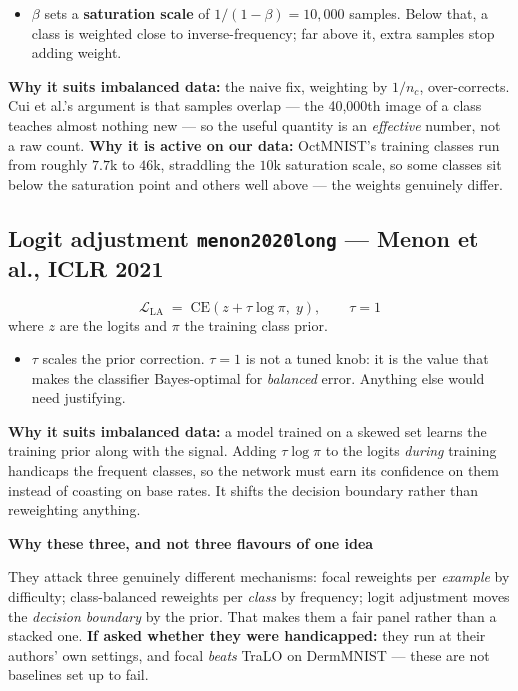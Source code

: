 \documentclass[11pt,a4paper]{article}
\newenvironment{callout}[1]
  {\par\medskip\noindent\begin{lrbox}{\calloutbox}%
   \begin{minipage}{\dimexpr\linewidth-20pt\relax}%
   \textbf{#1}\par\smallskip}
  {\end{minipage}\end{lrbox}%
   \setlength{\fboxsep}{10pt}%
   \colorbox{boxgrey}{\usebox{\calloutbox}}\par\medskip}
\begin{document}
\begin{itemize}
\item $\beta$ sets a \textbf{saturation scale} of $1/(1-\beta) = 10{,}000$ samples. Below
that, a class is weighted close to inverse-frequency; far above it, extra samples stop
adding weight.
\end{itemize}

\textbf{Why it suits imbalanced data:} the naive fix, weighting by $1/n_c$, over-corrects.
Cui et al.'s argument is that samples overlap --- the 40{,}000th image of a class teaches
almost nothing new --- so the useful quantity is an \emph{effective} number, not a raw
count. \textbf{Why it is active on our data:} OctMNIST's training classes run from roughly
$7.7$k to $46$k, straddling the $10$k saturation scale, so some classes sit below the
saturation point and others well above --- the weights genuinely differ.

\subsection{Logit adjustment \quad\small\texttt{menon2020long} --- Menon et al., ICLR 2021}
\[
\mathcal{L}_{\text{LA}} \;=\; \mathrm{CE}\!\left(z + \tau\log\pi,\; y\right),
\qquad \tau = 1
\]
where $z$ are the logits and $\pi$ the training class prior.

\begin{itemize}
\item $\tau$ scales the prior correction. $\tau{=}1$ is not a tuned knob: it is the value
that makes the classifier Bayes-optimal for \emph{balanced} error. Anything else would need
justifying.
\end{itemize}

\textbf{Why it suits imbalanced data:} a model trained on a skewed set learns the training
prior along with the signal. Adding $\tau\log\pi$ to the logits \emph{during} training
handicaps the frequent classes, so the network must earn its confidence on them instead of
coasting on base rates. It shifts the decision boundary rather than reweighting anything.

\begin{callout}{Why these three, and not three flavours of one idea}
They attack three genuinely different mechanisms: focal reweights per \emph{example} by
difficulty; class-balanced reweights per \emph{class} by frequency; logit adjustment moves
the \emph{decision boundary} by the prior. That makes them a fair panel rather than a
stacked one. \textbf{If asked whether they were handicapped:} they run at their authors'
own settings, and focal \emph{beats} TraLO on DermMNIST --- these are not baselines set up
to fail.
\end{callout}
\end{document}
